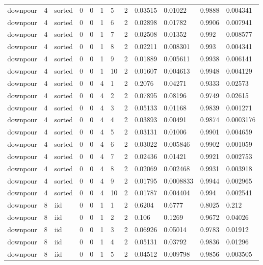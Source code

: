 \begin{tabular}{llllllllllll}
downpour & 4 & sorted & 0 & 0 & 1 & 5 & 2 & 0.03515 & 0.01022 & 0.9888 & 0.004341 \\
downpour & 4 & sorted & 0 & 0 & 1 & 6 & 2 & 0.02898 & 0.01782 & 0.9906 & 0.007941 \\
downpour & 4 & sorted & 0 & 0 & 1 & 7 & 2 & 0.02508 & 0.01352 & 0.992 & 0.008577 \\
downpour & 4 & sorted & 0 & 0 & 1 & 8 & 2 & 0.02211 & 0.008301 & 0.993 & 0.004341 \\
downpour & 4 & sorted & 0 & 0 & 1 & 9 & 2 & 0.01889 & 0.005611 & 0.9938 & 0.006141 \\
downpour & 4 & sorted & 0 & 0 & 1 & 10 & 2 & 0.01607 & 0.004613 & 0.9948 & 0.004129 \\
downpour & 4 & sorted & 0 & 0 & 4 & 1 & 2 & 0.2076 & 0.04271 & 0.9333 & 0.02573 \\
downpour & 4 & sorted & 0 & 0 & 4 & 2 & 2 & 0.07895 & 0.08196 & 0.9749 & 0.02615 \\
downpour & 4 & sorted & 0 & 0 & 4 & 3 & 2 & 0.05133 & 0.01168 & 0.9839 & 0.001271 \\
downpour & 4 & sorted & 0 & 0 & 4 & 4 & 2 & 0.03893 & 0.00491 & 0.9874 & 0.0003176 \\
downpour & 4 & sorted & 0 & 0 & 4 & 5 & 2 & 0.03131 & 0.01006 & 0.9901 & 0.004659 \\
downpour & 4 & sorted & 0 & 0 & 4 & 6 & 2 & 0.03022 & 0.005846 & 0.9902 & 0.001059 \\
downpour & 4 & sorted & 0 & 0 & 4 & 7 & 2 & 0.02436 & 0.01421 & 0.9921 & 0.002753 \\
downpour & 4 & sorted & 0 & 0 & 4 & 8 & 2 & 0.02069 & 0.002468 & 0.9931 & 0.003918 \\
downpour & 4 & sorted & 0 & 0 & 4 & 9 & 2 & 0.01795 & 0.0008833 & 0.9944 & 0.002965 \\
downpour & 4 & sorted & 0 & 0 & 4 & 10 & 2 & 0.01787 & 0.004404 & 0.994 & 0.002541 \\
downpour & 8 & iid & 0 & 0 & 1 & 1 & 2 & 0.6204 & 0.6777 & 0.8025 & 0.212 \\
downpour & 8 & iid & 0 & 0 & 1 & 2 & 2 & 0.106 & 0.1269 & 0.9672 & 0.04026 \\
downpour & 8 & iid & 0 & 0 & 1 & 3 & 2 & 0.06926 & 0.05014 & 0.9783 & 0.01912 \\
downpour & 8 & iid & 0 & 0 & 1 & 4 & 2 & 0.05131 & 0.03792 & 0.9836 & 0.01296 \\
downpour & 8 & iid & 0 & 0 & 1 & 5 & 2 & 0.04512 & 0.009798 & 0.9856 & 0.003505 \\

\end{tabular}
